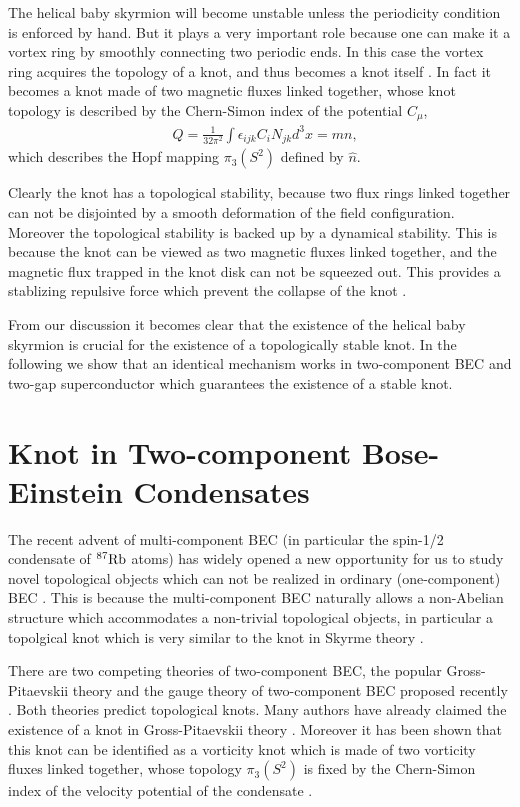 \documentclass[twocolumn,showpacs,showkeys]{revtex4}
\newcommand{\bea}{\begin{eqnarray}}
\newcommand{\eea}{\end{eqnarray}}
\newcommand{\dfrac}{\displaystyle\frac}
\newcommand{\hn}{\hat n}
\begin{document}
The helical baby skyrmion will become
unstable unless the periodicity condition is enforced by
hand. But it plays a very important role
because one can make it a vortex ring by smoothly connecting
two periodic ends. In this case the vortex ring 
acquires the topology of a knot, and thus becomes a knot 
itself \cite{prl01,plb04}. In fact it becomes a knot made of two
magnetic fluxes linked together, whose knot topology is described by
the Chern-Simon index of the potential $C_\mu$,
\bea
&Q = \dfrac{1}{32\pi^2} \int \epsilon_{ijk} C_i N_{jk} d^3x = mn,
\label{kqn}
\eea
which describes the Hopf mapping $\pi_3(S^2)$ defined by $\hn$.

Clearly the knot has a topological stability, because two
flux rings linked together can not be disjointed by a smooth
deformation of the field configuration.
Moreover the topological stability is 
backed up by a dynamical stability. This is because
the knot can be viewed as two magnetic fluxes linked together,
and the magnetic flux trapped in the knot disk
can not be squeezed out. This provides
a stablizing repulsive force which prevent the collapse 
of the knot \cite{plb04}.

From our discussion it becomes clear that the existence of 
the helical baby skyrmion is crucial for the existence of a topologically
stable knot. In the following we show that an identical mechanism 
works in two-component BEC and two-gap superconductor 
which guarantees the existence of a stable knot.

\section{Knot in Two-component Bose-Einstein Condensates}

The recent advent of multi-component BEC (in particular
the spin-1/2 condensate of $^{87}{\rm Rb}$ atoms)
has widely opened a new opportunity for
us to study novel topological objects which can not be
realized in ordinary (one-component) BEC \cite{bec,ruo}.
This is because the multi-component BEC naturally allows
a non-Abelian structure which accommodates a non-trivial
topological objects, in particular a topolgical knot which is
very similar to the knot in Skyrme theory \cite{bec1,bec5}.
 
There are two competing theories of two-component BEC,
the popular Gross-Pitaevskii theory \cite{ruo} and the gauge theory
of two-component BEC proposed recently \cite{bec1}. 
Both theories predict topological knots. 
Many authors have already claimed 
the existence of a knot in Gross-Pitaevskii theory \cite{ruo}.
Moreover it has been shown that this knot can be identified 
as a vorticity knot which is made of
two vorticity fluxes linked together, whose topology $\pi_3(S^2)$
is fixed by the Chern-Simon index of the velocity potential
of the condensate \cite{bec5}.
\end{document}
